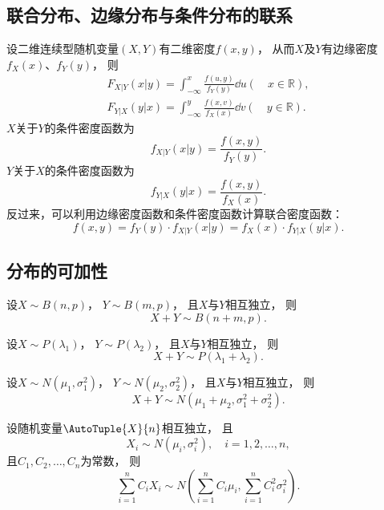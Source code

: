\subsection*{联合分布、边缘分布与条件分布的联系}
设二维连续型随机变量\((X,Y)\)有二维密度\(f(x,y)\)，
从而\(X\)及\(Y\)有边缘密度\(f_X(x)\)、\(f_Y(y)\)，
则\begin{gather*}
	F_{X \vert Y}(x \vert y)
	= \int_{-\infty}^x \frac{f(u,y)}{f_Y(y)}\dd{u}
	(\quad x \in \mathbb{R}), \\
	F_{Y \vert X}(y \vert x)
	= \int_{-\infty}^y \frac{f(x,v)}{f_X(x)}\dd{v}
	(\quad y \in \mathbb{R}).
\end{gather*}
\(X\)关于\(Y\)的条件密度函数为\begin{equation*}
	f_{X \vert Y}(x \vert y)
	= \frac{f(x,y)}{f_Y(y)}.
\end{equation*}
\(Y\)关于\(X\)的条件密度函数为\begin{equation*}
	f_{Y \vert X}(y \vert x)
	= \frac{f(x,y)}{f_X(x)}.
\end{equation*}
反过来，可以利用边缘密度函数和条件密度函数计算联合密度函数：\begin{equation*}
	f(x,y) = f_Y(y) \cdot f_{X \vert Y}(x \vert y)
	= f_X(x) \cdot f_{Y \vert X}(y \vert x).
\end{equation*}

\subsection*{分布的可加性}
设\(X \sim B(n,p)\)，
\(Y \sim B(m,p)\)，
且\(X\)与\(Y\)相互独立，
则\[
	X+Y \sim B(n+m,p).
\]

设\(X \sim P(\lambda_1)\)，
\(Y \sim P(\lambda_2)\)，
且\(X\)与\(Y\)相互独立，
则\[
	X+Y \sim P(\lambda_1 + \lambda_2).
\]

设\(X \sim N(\mu_1,\sigma_1^2)\)，
\(Y \sim N(\mu_2,\sigma_2^2)\)，
且\(X\)与\(Y\)相互独立，
则\begin{equation*}
	X+Y \sim N(\mu_1+\mu_2,\sigma_1^2+\sigma_2^2).
\end{equation*}

设随机变量\(\AutoTuple{X}{n}\)相互独立，
且\[
	X_i \sim N(\mu_i,\sigma_i^2),
	\quad i=1,2,\dotsc,n,
\]
且\(C_1,C_2,\dotsc,C_n\)为常数，
则\begin{equation*}
	\sum_{i=1}^n {C_i X_i}
	\sim N\left(
	\sum_{i=1}^n {C_i \mu_i},
	\sum_{i=1}^n {C_i^2 \sigma_i^2}
	\right).
\end{equation*}
